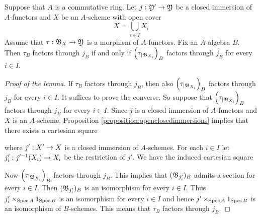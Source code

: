 \begin{lemma}\label{lemma:coveringsandfactorizations}
Suppose that $A$ is a commutative ring. Let $j:{\mathfrak Y}'\rightarrow {\mathfrak Y}$ be a closed immersion of $A$-functors and $X$ be an $A$-scheme with open cover
$$X=\bigcup_{i\in I}X_i$$
Assume that $\tau:{\mathfrak B}_X\rightarrow {\mathfrak Y}$ is a morphism of $A$-functors. Fix an $A$-algebra $B$. Then $\tau_B$ factors through $j_B$ if and only if $\left(\tau_{\mid {\mathfrak B}_{X_i}}\right)_B$ factors through $j_B$ for every $i\in I$.
\end{lemma}
\begin{proof}[Proof of the lemma]
If $\tau_B$ factors through $j_B$, then also $\left(\tau_{\mid {\mathfrak B}_{X_i}}\right)_B$ factors through $j_B$ for every $i\in I$. It suffices to prove the converse. So suppose that $\left(\tau_{\mid {\mathfrak B}_{X_i}}\right)_B$ factors through $j_B$ for every $i\in I$. Since $j$ is a closed immersion of $A$-functors and $X$ is an $A$-scheme, Proposition \ref{proposition:openclosedimmersions} implies that there exists a cartesian square
\begin{center}
\end{center}
where $j':X'\rightarrow X$ is a closed immersion of $A$-schemes. For each $i\in I$ let $j'_i:j'^{-1}(X_i)\rightarrow X_i$ be the restriction of $j'$. We have the induced cartesian square
\begin{center}
\end{center}
Now $\left(\tau_{\mid {\mathfrak B}_{X_i}}\right)_B$ factors through $j_B$. This implies that $({\mathfrak B}_{j'_i})_B$ admits a section for every $i\in I$. Then $({\mathfrak B}_{j'_i})_B$ is an isomorphism for every $i\in I$. Thus $j'_i\times_{\mathrm{Spec}\, A}1_{\mathrm{Spec}\, B}$ is an isomorphism for every $i\in I$ and hence $j'\times_{\mathrm{Spec}\, A}1_{\mathrm{Spec}\, B}$ is an isomorphism of $B$-schemes. This means that $\tau_B$ factors through $j_B$.
\end{proof}

